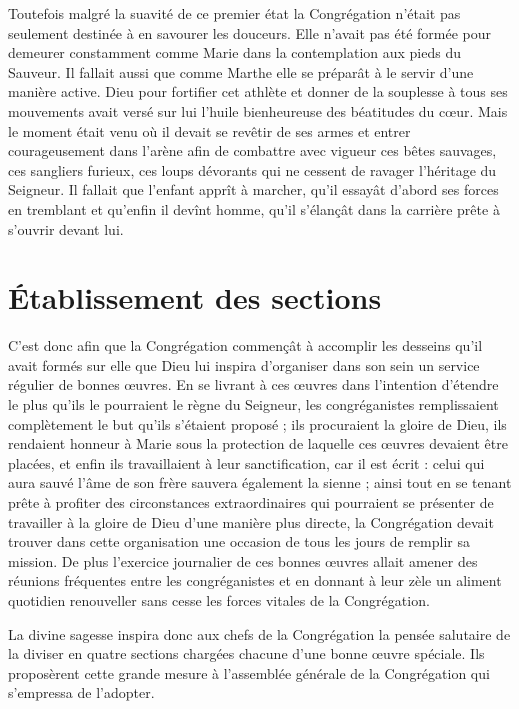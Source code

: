 Toutefois malgré la suavité de ce premier état la Congrégation n'était pas seulement destinée à en savourer les douceurs. Elle n'avait pas été formée pour demeurer constamment comme Marie dans la contemplation aux pieds du Sauveur. Il fallait aussi que comme Marthe elle se préparât à le servir d'une manière active. Dieu pour fortifier cet athlète et donner de la souplesse à tous ses mouvements avait versé
sur lui l'huile bienheureuse des béatitudes du cœur. Mais le moment était venu où il devait se revêtir de ses armes et entrer courageusement dans l'arène afin de combattre avec vigueur ces bêtes sauvages, ces sangliers furieux, ces loups dévorants qui ne cessent de ravager l'héritage du Seigneur. Il fallait que l'enfant apprît à marcher, qu'il essayât d'abord ses forces en tremblant et qu'enfin il devînt homme, qu'il s'élançât dans la carrière prête à s'ouvrir devant lui.

\section*{Établissement des sections}
C'est donc afin que la Congrégation commençât à accomplir les desseins qu'il avait formés sur elle que Dieu lui inspira d'organiser dans son sein un service régulier de bonnes œuvres. En se livrant à ces œuvres dans l'intention d'étendre le plus qu'ils le pourraient le règne du Seigneur, les congréganistes remplissaient complètement le but qu'ils s'étaient proposé ; ils procuraient la gloire de Dieu, ils rendaient honneur à Marie sous la protection de laquelle ces œuvres devaient être placées, et enfin ils travaillaient à leur sanctification, car il est écrit : celui qui aura sauvé l'âme de son frère sauvera également la sienne ; ainsi tout en se tenant prête à profiter des circonstances extraordinaires qui pourraient se présenter de travailler à la gloire de Dieu d'une manière plus directe, la Congrégation devait trouver dans cette organisation une occasion de tous les jours de remplir sa mission. De plus l'exercice journalier de ces bonnes œuvres allait amener des réunions fréquentes entre les congréganistes et en donnant à leur zèle un aliment quotidien renouveller sans cesse les forces vitales de la Congrégation.

La divine sagesse inspira donc aux chefs de la Congrégation
la pensée salutaire de la diviser en quatre sections chargées chacune d'une bonne œuvre spéciale. Ils proposèrent cette grande mesure à l'assemblée générale de la Congrégation qui s'empressa de l'adopter.

